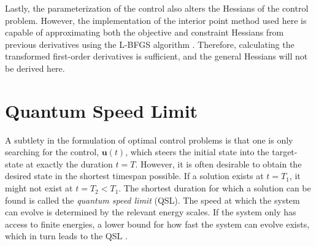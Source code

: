 Lastly, the parameterization of the control also alters the Hessians of the control problem. However, the implementation of the interior point method used here \cite{Wachter2006} is capable of approximating both the objective and constraint Hessians from previous derivatives using the L-BFGS algorithm \cite{Liu1989}. Therefore, calculating the transformed first-order derivatives is sufficient, and the general Hessians will not be derived here.


\section{Quantum Speed Limit}
A subtlety in the formulation of optimal control problems is that one is only searching for the control, $\boldsymbol{u}(t)$, which steers the initial state into the target-state at exactly the duration $t = T$. However, it is often desirable to obtain the desired state in the shortest timespan possible. If a solution exists at $t= T_1$, it might not exist at $t = T_2 < T_1$. The shortest duration for which a solution can be found is called the \textit{quantum speed limit} (QSL). The speed at which the system can evolve is determined by the relevant energy scales. If the system only has access to finite energies, a lower bound for how fast the system can evolve exists, which in turn leads to the QSL \cite{Caneva2009}.

